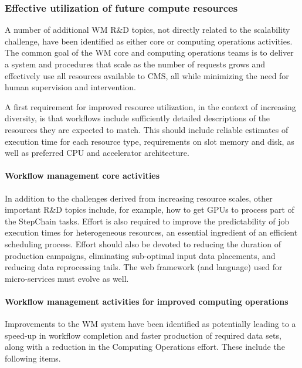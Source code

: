\subsubsection{Effective utilization of future compute resources}

A number of additional \gls{WM} R\&D topics, not directly related to the scalability challenge, have been identified as either core or computing operations activities. The common goal of the \gls{WM} core and computing operations teams is to deliver a system and procedures that scale as the number of requests grows and effectively use all resources available to CMS, all while minimizing the need for human supervision and intervention. 

A first requirement for improved resource utilization, in the context of increasing diversity, is that workflows include sufficiently detailed descriptions of the resources they are expected to match. This should include reliable estimates of execution time for each resource type, requirements on slot memory and disk, as well as preferred \gls{CPU} and accelerator architecture.

\paragraph*{Workflow management core activities}
In addition to the challenges derived from increasing resource scales, other important R\&D topics include, for example, how to get \glspl{GPU} to process part of the StepChain tasks. Effort is also required to improve the predictability of job execution times for heterogeneous resources, an essential ingredient of an efficient scheduling process. Effort should also be devoted to reducing the duration of production campaigns, eliminating sub-optimal input data placements, and reducing data reprocessing tails. The web framework (and language) used for micro-services must evolve as well.

\paragraph*{Workflow management activities for improved computing operations}
Improvements to the \gls{WM} system have been identified as potentially leading to a speed-up in workflow completion and faster production of required data sets, along with a reduction in the Computing Operations effort. These include the following items.

